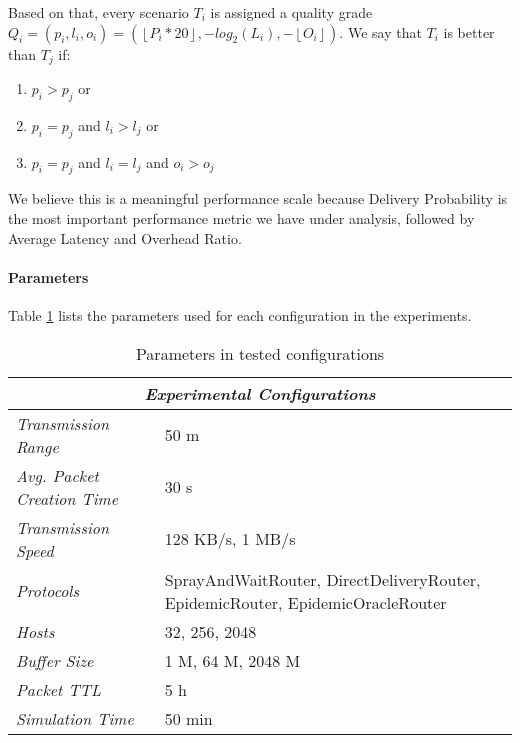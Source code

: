 Based on that, every scenario $T_i$ is assigned a quality grade $Q_i = (p_i,
l_i, o_i) = (\left \lfloor{P_i * 20}\right \rfloor, - log_{2}(L_i), - \left \lfloor{O_i}\right \rfloor)$.
We say that $T_i$ is better than $T_j$ if:

\begin{enumerate}
    \item $p_i > p_j$ or
    \item $p_i = p_j$ and $l_i > l_j$ or
    \item $p_i = p_j$ and $l_i = l_j$ and $o_i > o_j$
\end{enumerate}

We believe this is a meaningful performance scale because Delivery
Probability is the most important performance metric we have under analysis,
followed by Average Latency and Overhead Ratio.

\paragraph{Parameters}

Table \ref{tab:params} lists the parameters used for each configuration
in the experiments.

\begin{table}[htpb]
\centering
    \begin{tabular}{@{}p{}p{}@{}}
        \toprule
        \multicolumn{2}{c}{\textit{Experimental Configurations}} \\ \midrule
        \textit{Transmission Range} &  50 m \\
        \addlinespace
        \textit{Avg. Packet Creation Time} & 30 s  \\
        \addlinespace
        \textit{Transmission Speed} & 128 KB/s, 1 MB/s \\
        \addlinespace
        \textit{Protocols} & SprayAndWaitRouter, DirectDeliveryRouter, EpidemicRouter, EpidemicOracleRouter \\
        \addlinespace
        \textit{Hosts} &  32, 256, 2048 \\
        \addlinespace
        \textit{Buffer Size} & 1 M, 64 M, 2048 M \\
        \addlinespace
        \textit{Packet TTL} &  5 h \\
        \addlinespace
        \textit{Simulation Time} &  50 min\\ \bottomrule
    \end{tabular}
    \caption{Parameters in tested configurations}
    \label{tab:params}
\end{table}

